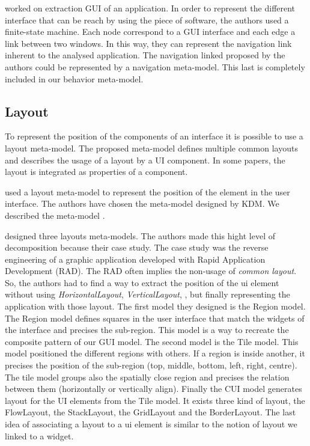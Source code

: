 \documentclass[conference]{IEEEtran}
\begin{document}
\citet{aho2013industrial} worked on extraction GUI of an application.
In order to represent the different interface that can be reach
    by using the piece of software, 
    the authors used a finite-state machine.
Each node correspond to a GUI interface and each edge a link between two windows.
In this way, they can represent the navigation link inherent to the analysed application.
The navigation linked proposed by the authors could be represented
    by a navigation meta-model.
This last is completely included in our behavior meta-model.

\subsection{Layout}
\label{sec:layout}

To represent the position of the components of an interface
    it is possible to use a layout meta-model.
The proposed meta-model defines multiple common layouts and
    describes the usage of a layout by a UI component.
In some papers, the layout is integrated as properties of a component.

\citet{gotti2016java} used a layout meta-model to represent
    the position of the element in the user interface.
The authors have chosen the meta-model designed by KDM.
We described the meta-model .

\citet{sanchez2014model} designed three layouts meta-models.
The authors made this hight level of decomposition because their case study.
The case study was the reverse engineering of a graphic application developed
    with Rapid Application Development (RAD).
The RAD often implies the non-usage of \textit{common layout}.
So, the authors had to find a way to extract the position of the ui element
    without using \textit{HorizontalLayout}, \textit{VerticalLayout}, \etc, but
    finally representing the application with those layout.
The first model they designed is the Region model.
The Region model defines squares in the user interface that match the widgets of the interface
    and precises the sub-region.
This model is a way to recreate the composite pattern of our GUI model.
The second model is the Tile model.
This model positioned the different regions with others.
If a region is inside another, it precises the position of the sub-region (top, middle, bottom, left, right, centre).
The tile model groups also the spatially close region and precises the relation between them (horizontally or vertically align).
Finally the CUI model generates layout for the UI elements from the Tile model.
It exists three kind of layout, the FlowLayout, the StackLayout, the GridLayout and the BorderLayout.
The last idea of associating a layout to a ui element is similar to the notion of layout we linked to a widget.
\end{document}
